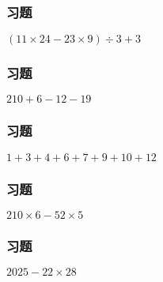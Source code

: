 \begin{frame}
    \frametitle{习题\theframecounter}
    \vspace*{-3cm}   
    \centering\textit{\Large $(11\times 24 - 23\times 9)\div 3 + 3$}
\end{frame}

\begin{frame}
    \frametitle{习题\theframecounter}
    \vspace*{-3cm}
    \centering\textit{\Large $210 + 6-12 - 19$}
\end{frame}

\begin{frame}
    \frametitle{习题\theframecounter} 
    \vspace*{-3cm}   
    \centering\textit{\Large $1+3+4+6+7+9+10 + 12$}
\end{frame}

\begin{frame}
    \frametitle{习题\theframecounter}
    \vspace*{-3cm}
    \centering\textit{\Large $210\times 6 - 52\times 5$}
\end{frame}

\begin{frame}
    \frametitle{习题\theframecounter}
    \vspace*{-3cm}
    \centering\textit{\Large $2025- 22\times 28$}
\end{frame}
